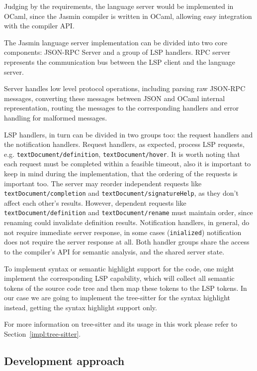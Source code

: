 Judging by the requirements, the language server would be implemented in OCaml, 
since the Jasmin compiler is written in OCaml, allowing easy integration 
with the compiler API. 

The Jasmin language server implementation can be divided into two core
components: JSON-RPC Server and a group of LSP handlers. RPC server represents
the communication bus between the LSP client and the language server. 

Server handles low level protocol operations, including parsing raw JSON-RPC
messages, converting these messages between JSON and OCaml internal
representation, routing the messages to the corresponding handlers and error
handling for malformed messages.

LSP handlers, in turn can be divided in two groups too: the request handlers and
the notification handlers. Request handlers, as expected, process LSP requests,
e.g. \texttt{textDocument/definition}, \texttt{textDocument/hover}. It is worth 
noting that each request must be completed within a feasible timeout, also it is
important to keep in mind during the implementation, that the ordering of the
requests is important too. The server may reorder independent requests like
\texttt{textDocument/completion} and \texttt{textDocument/signatureHelp}, as
they don't affect each other's results. However, dependent requests like
\texttt{textDocument/definition} and \texttt{textDocument/rename} must maintain
order, since renaming could invalidate definition results. Notification handlers, 
in general, do not require immediate server response, in some cases
(\texttt{inialized}) notification does not require the server response at all.
Both handler groups share the access to the compiler's API for semantic analysis,
and the shared server state. 

To implement syntax or semantic highlight support for the code, one might 
implement the corresponding LSP capability, which will collect all semantic 
tokens of the source code tree and then map these tokens to the LSP tokens.  
In our case we are going to implement the tree-sitter for the syntax highlight
instead, getting the syntax highlight support only.

For more information on tree-sitter and its usage in this work please refer to
Section~\ref{impl:tree-sitter}.

\subsection{Development approach}

